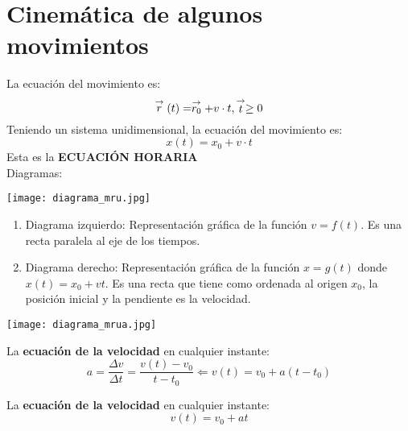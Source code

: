 \section{Cinemática de algunos movimientos}

La ecuación del movimiento es:
$$\stackrel{\to}{r}(t) = \stackrel{\to}{r_0} + v \cdot t , \stackrel{\to}{t} \geq 0$$
Teniendo un sistema unidimensional, la ecuación del movimiento es:
$$x(t) = x_0 + v \cdot t$$
Esta es la \textbf{ECUACIÓN HORARIA}\\
Diagramas:
\begin{center}
    \texttt{[image: diagrama\_mru.jpg]}
\end{center}
\begin{enumerate}
    \item Diagrama izquierdo: Representación gráfica de la función $v = f(t)$. Es una recta paralela al eje de los tiempos.
    \item Diagrama derecho: Representación gráfica de la función $x = g(t)$ donde $x(t) = x_0 + v t$. Es una recta que tiene como ordenada al origen $x_0$, la posición inicial y la pendiente es la velocidad.
\end{enumerate}


\begin{center}
    \texttt{[image: diagrama\_mrua.jpg]}
\end{center}

La \textbf{ecuación de la velocidad} en cualquier instante:
$$a = \frac{\Delta v}{\Delta t} = \frac{v(t) - v_0}{t-t_0} \Leftarrow v(t) = v_0 + a (t-t_0)$$

La \textbf{ecuación de la velocidad} en cualquier instante:
$$\boxed{v(t) = v_0 + a t}$$

